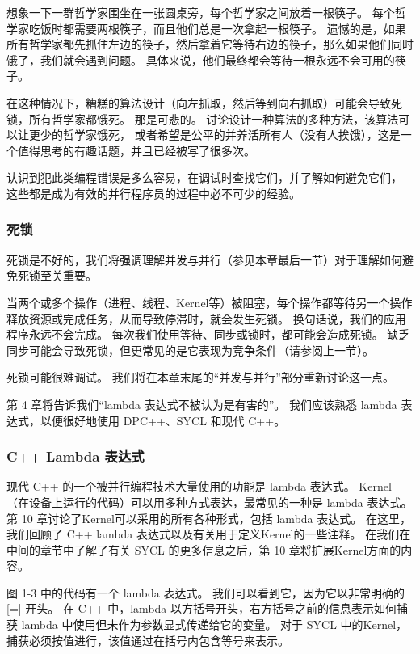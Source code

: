 \begin{remark}
想象一下一群哲学家围坐在一张圆桌旁，每个哲学家之间放着一根筷子。 
每个哲学家吃饭时都需要两根筷子，而且他们总是一次拿起一根筷子。 
遗憾的是，如果所有哲学家都先抓住左边的筷子，然后拿着它等待右边的筷子，那么如果他们同时饿了，我们就会遇到问题。 
具体来说，他们最终都会等待一根永远不会可用的筷子。

在这种情况下，糟糕的算法设计（向左抓取，然后等到向右抓取）可能会导致死锁，所有哲学家都饿死。 
那是可悲的。 讨论设计一种算法的多种方法，该算法可以让更少的哲学家饿死，
或者希望是公平的并养活所有人（没有人挨饿），这是一个值得思考的有趣话题，并且已经被写了很多次。

认识到犯此类编程错误是多么容易，在调试时查找它们，并了解如何避免它们，
这些都是成为有效的并行程序员的过程中必不可少的经验。
\end{remark}

\subsubsection{死锁}
死锁是不好的，我们将强调理解并发与并行（参见本章最后一节）对于理解如何避免死锁至关重要。

当两个或多个操作（进程、线程、Kernel等）被阻塞，每个操作都等待另一个操作释放资源或完成任务，从而导致停滞时，就会发生死锁。 
换句话说，我们的应用程序永远不会完成。 每次我们使用等待、同步或锁时，都可能会造成死锁。 
缺乏同步可能会导致死锁，但更常见的是它表现为竞争条件（请参阅上一节）。

死锁可能很难调试。 我们将在本章末尾的“并发与并行”部分重新讨论这一点。

\begin{remark}
	第 4 章将告诉我们“lambda 表达式不被认为是有害的”。 
	我们应该熟悉 lambda 表达式，以便很好地使用 DPC++、SYCL 和现代 C++。
\end{remark}

\subsubsection{C++ Lambda 表达式}
现代 C++ 的一个被并行编程技术大量使用的功能是 lambda 表达式。 
Kernel（在设备上运行的代码）可以用多种方式表达，最常见的一种是 lambda 表达式。 
第 10 章讨论了Kernel可以采用的所有各种形式，包括 lambda 表达式。 
在这里，我们回顾了 C++ lambda 表达式以及有关用于定义Kernel的一些注释。 
在我们在中间的章节中了解了有关 SYCL 的更多信息之后，第 10 章将扩展Kernel方面的内容。

图 1-3 中的代码有一个 lambda 表达式。 我们可以看到它，因为它以非常明确的 [=] 开头。 
在 C++ 中，lambda 以方括号开头，右方括号之前的信息表示如何捕获 lambda 中使用但未作为参数显式传递给它的变量。 
对于 SYCL 中的Kernel，捕获必须按值进行，该值通过在括号内包含等号来表示。

